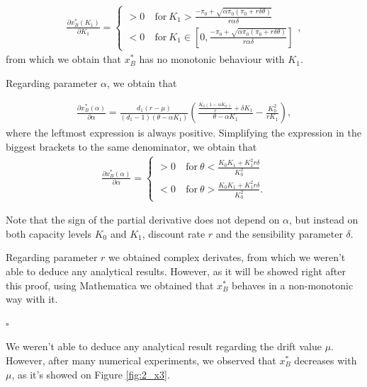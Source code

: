 \begin{align*}
\frac{\partial x^*_B ( K_1 ) }{\partial K_1}= 
\begin{cases}
>0 &\ \text{for} \ K_1>\frac{-\pi_0+\sqrt{\alpha \pi_0 (\pi_0 + r \delta \theta)}}{ r\alpha \delta}\\
<0 &\ \text{for} \ K_1 \in \left[ 0, \frac{-\pi_0+\sqrt{\alpha \pi_0(\pi_0 + r \delta \theta)}}{ r\alpha \delta} \right]
\end{cases},
\end{align*}
from which we obtain that $x^*_B$ has no monotonic behaviour with $K_1$.


Regarding parameter $\alpha$, we obtain that

\begin{align*}
\frac{\partial x^*_B ( \alpha ) }{\partial \alpha}= 
\frac{d_1 (r-\mu )}{ (d_1-1)(\theta-\alpha K_1)}  \left( \frac{\frac{K_0(1-\alpha K_0)}{r}+ \delta K_1  }{\theta-\alpha K_1} -\frac{ K_0^2}{r K_1} \right),
\end{align*}
where the leftmost expression is always positive. Simplifying the expression in the biggest brackets to the same denominator, we obtain that
\begin{align*}
\frac{\partial x^*_B ( \alpha ) }{\partial \alpha}= 
\begin{cases}
>0 &\ \text{for} \ \theta < \frac{K_0 K_1 +K_1^2 r\delta}{K_0^2}\\
<0 &\ \text{for} \ \theta > \frac{K_0 K_1 +K_1^2 r\delta}{K_0^2}.
\end{cases}
\end{align*}

Note that the sign of the partial derivative does not depend on $\alpha$, but instead on both capacity levels $K_0$ and $K_1$, discount rate $r$ and the sensibility parameter $\delta$.

Regarding parameter $r$ we obtained complex derivates, from which we weren't able to deduce any analytical results. However, as it will be showed right after this proof, using Mathematica we obtained that $x^*_B$ behaves in a non-monotonic way with it.

\begin{flushright}
	$\square$
\end{flushright}

We weren't able to deduce any analytical result regarding the drift value $\mu$. However, after many numerical experiments, we observed that $x_B^*$ decreases with $\mu$, as it's showed on Figure \ref{fig:2_x3}.


